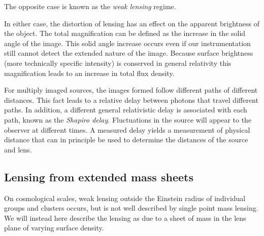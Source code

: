 The opposite case is known as the {\it weak lensing} regime. 

In either case, the distortion of lensing has an effect on the
apparent brightness of the object. The total magnification can be
defined as the increase in the solid angle of the image. This solid
angle increase occurs even if our instrumentation still cannot detect
the extended nature of the image. Because surface brightness (more
technically specific intensity) is conserved in general relativity
this magnification leads to an increase in total flux density.

For multiply imaged sources, the images formed follow different paths
of different distances. This fact leads to a relative delay between
photons that travel different paths. In addition, a different general
relativistic delay is associated with each path, known as the {\it
Shapiro delay}. Fluctuations in the source will appear to the observer
at different times. A measured delay yields a measurement of physical
distance that can in principle be used to determine the distances of
the source and lens.

\subsection{Lensing from extended mass sheets}

On cosmological scales, weak lensing outside the Einstein radius of
individual groups and clusters occurs, but is not well described by
single point mass lensing. We will instead here describe the lensing
as due to a sheet of mass in the lens plane of varying surface
density. 

